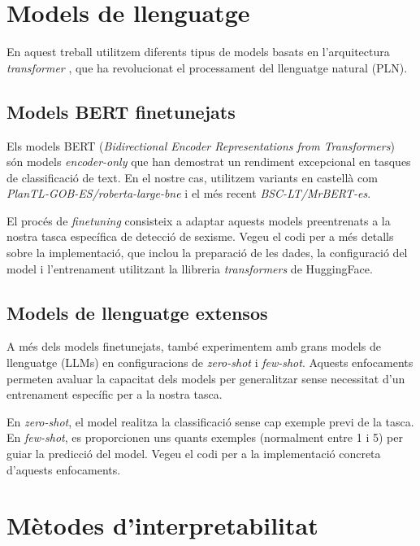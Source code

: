 \section{Models de llenguatge}

En aquest treball utilitzem diferents tipus de models basats en l'arquitectura \textit{transformer} 
\cite{vaswaniAttentionAllYou2017}, que ha revolucionat el processament del llenguatge natural (PLN). 

\subsection{Models BERT finetunejats}

Els models BERT (\textit{Bidirectional Encoder Representations from Transformers})~\cite{devlin2019bert} són models 
\textit{encoder-only} que han demostrat un rendiment excepcional en tasques de classificació de text.
En el nostre cas, utilitzem variants en castellà com \textit{PlanTL-GOB-ES/roberta-large-bne} i 
el més recent \textit{BSC-LT/MrBERT-es}.

El procés de \textit{finetuning} consisteix a adaptar aquests models preentrenats a la nostra tasca 
específica de detecció de sexisme. Vegeu el codi per a més detalls sobre la implementació, que 
inclou la preparació de les dades, la configuració del model i l'entrenament utilitzant la 
llibreria \textit{transformers} de HuggingFace.

\subsection{Models de llenguatge extensos}

A més dels models finetunejats, també experimentem amb grans models de llenguatge (LLMs) 
en configuracions de \textit{zero-shot} i \textit{few-shot}. Aquests enfocaments permeten 
avaluar la capacitat dels models per generalitzar sense necessitat d'un entrenament 
específic per a la nostra tasca.

En \textit{zero-shot}, el model realitza la classificació sense cap exemple 
previ de la tasca. En \textit{few-shot}, es proporcionen uns quants exemples (normalment 
entre 1 i 5) per guiar la predicció del model. Vegeu el codi per a la implementació concreta 
d'aquests enfocaments.

\section{Mètodes d'interpretabilitat}

